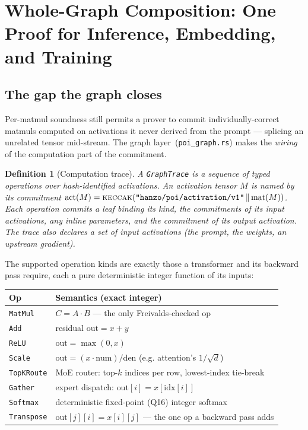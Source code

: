 \documentclass[11pt,a4paper]{article}
\newtheorem{definition}{Definition}
\begin{document}
\section{Whole-Graph Composition: One Proof for Inference, Embedding, and Training}\label{sec:graph}

\subsection{The gap the graph closes}

Per-matmul soundness still permits a prover to commit individually-correct matmuls computed on activations it never derived from the prompt --- splicing an unrelated tensor mid-stream. The graph layer~(\texttt{poi\_graph.rs}) makes the \emph{wiring} of the computation part of the commitment.

\begin{definition}[Computation trace]
A \texttt{GraphTrace} is a sequence of typed operations over hash-identified activations. An activation tensor $M$ is named by its commitment $\mathrm{act}(M) = \textsc{keccak}(\texttt{"hanzo/poi/activation/v1"} \,\|\, \mathrm{mat}(M))$. Each operation commits a leaf binding its kind, the commitments of its input activations, any inline parameters, and the commitment of its output activation. The trace also declares a set of \emph{input} activations (the prompt, the weights, an upstream gradient).
\end{definition}

The supported operation kinds are exactly those a transformer and its backward pass require, each a pure deterministic integer function of its inputs:
\begin{center}
\begin{tabular}{ll}
\toprule
\textbf{Op} & \textbf{Semantics (exact integer)} \\
\midrule
\texttt{MatMul} & $C = A\cdot B$ --- the only Freivalds-checked op \\
\texttt{Add} & residual $\text{out} = x + y$ \\
\texttt{ReLU} & $\text{out} = \max(0, x)$ \\
\texttt{Scale} & $\text{out} = (x \cdot \text{num}) / \text{den}$ (e.g. attention's $1/\sqrt{d}$) \\
\texttt{TopKRoute} & MoE router: top-$k$ indices per row, lowest-index tie-break \\
\texttt{Gather} & expert dispatch: $\text{out}[i] = x[\text{idx}[i]]$ \\
\texttt{Softmax} & deterministic fixed-point (Q16) integer softmax \\
\texttt{Transpose} & $\text{out}[j][i] = x[i][j]$ --- the one op a backward pass adds \\
\bottomrule
\end{tabular}
\end{center}
\end{document}

